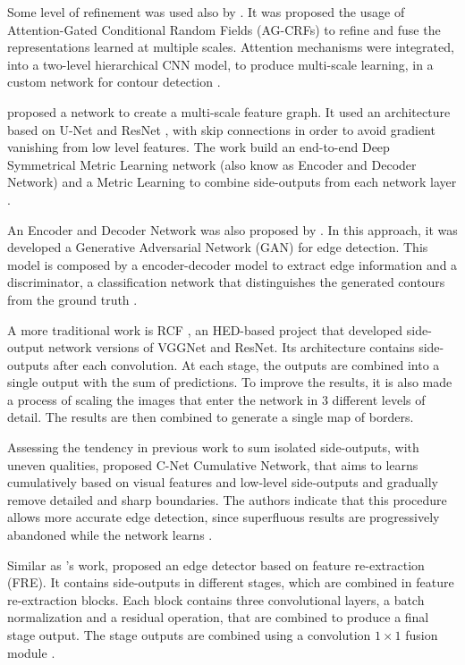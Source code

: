 Some level of refinement was used also by \cite{DeepStructured:2017:Xu20173962}.
It was proposed the usage of Attention-Gated Conditional Random Fields (AG-CRFs) to refine and fuse the representations learned at multiple scales.
Attention mechanisms were integrated, into a two-level hierarchical CNN model, to produce multi-scale learning, in a custom network for contour detection \cite{DeepStructured:2017:Xu20173962}.

\cite{ProeminentEdge:2018:Cai2018} proposed a network to create a multi-scale feature graph.
It used an architecture based on U-Net \cite{Unet:2015} and ResNet \cite{RESNET:2016:7780459}, with skip connections in order to avoid gradient vanishing from low level features.
The work build an end-to-end Deep Symmetrical Metric Learning network (also know as Encoder and Decoder Network) and a Metric Learning to combine side-outputs from each network layer \cite{ProeminentEdge:2018:Cai2018}.

An Encoder and Decoder Network was also proposed by \cite{Yang:2019}.
In this approach, it was developed a Generative Adversarial Network (GAN) for edge detection.
This model is composed by a encoder-decoder model to extract edge information and a discriminator, a classification network that distinguishes the generated contours from the ground truth \cite{Yang:2019}.

A more traditional work is RCF \cite{RCF:2019}, an HED-based project that developed side-output network versions of VGGNet and ResNet.
Its architecture contains side-outputs after each convolution.
At each stage, the outputs are combined into a single output with the sum of predictions.
To improve the results, it is also made a process of scaling the images that enter the network in 3 different levels of detail.
The results are then combined to generate a single map of borders.

Assessing the tendency in previous work to sum isolated side-outputs, with uneven qualities, \cite{Cumulative:Song20181847} proposed C-Net Cumulative Network, that aims to learns cumulatively based on visual features and low-level side-outputs and gradually remove detailed and sharp boundaries.
The authors indicate that this procedure allows more accurate edge detection, since superfluous results are progressively abandoned while the network learns \cite{Cumulative:Song20181847}.

Similar as \cite{Cumulative:Song20181847}'s work, \cite{ReExtraction:Wen201884} proposed an edge detector based on feature re-extraction (FRE).
It contains side-outputs in different stages, which are combined in feature re-extraction blocks.
Each block contains three convolutional layers, a batch normalization and a residual operation, that are combined to produce a final stage output.
The stage outputs are combined using a convolution $1 \times 1$ fusion module \cite{ReExtraction:Wen201884}.

